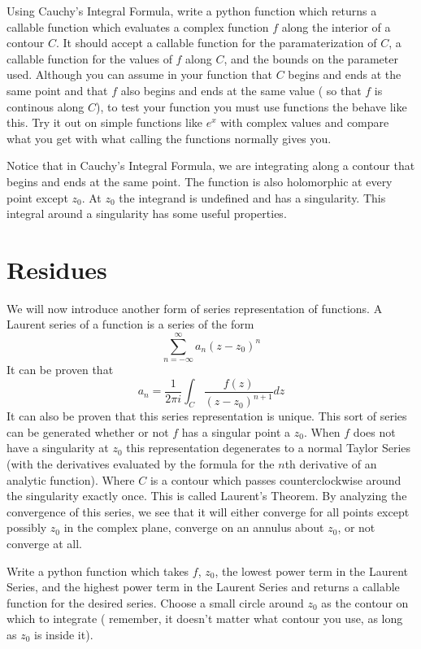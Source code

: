 \begin{problem}
Using Cauchy's Integral Formula, write a python function which returns a callable function which evaluates a complex function $f$ along the interior of a contour $C$. It should accept a callable function for the paramaterization of $C$, a callable function for the values of $f$ along $C$, and the bounds on the parameter used. Although you can assume in your function  that $C$ begins and ends at the same point and that $f$ also begins and ends at the same value ( so that $f$ is continous along $C$), to test your function you must use functions the behave like this. Try it out on simple functions like $e^x$ with complex values and compare what you get with what calling the functions normally gives you.
\end{problem}

Notice that in Cauchy's Integral Formula, we are integrating along a contour that begins and ends at the same point.
The function is also holomorphic at every point except $z_0$. At $z_0$ the integrand is undefined and has a singularity.
This integral around a singularity has some useful properties.

\section*{Residues}

We will now introduce another form of series representation of functions.
A Laurent series of a function is a series of the form $$\sum_{n= -\infty}^{\infty} a_n (z-z_0)^n$$
It can be proven that 
$$a_n = \frac{1}{2\pi i} \int_C \frac{f(z)}{(z-z_0)^{n+1}} dz$$ 
It can also be proven that this series representation is unique.
This sort of series can be generated whether or not $f$ has a singular point a $z_0$.
When $f$ does not have a singularity at $z_0$ this representation degenerates to a normal Taylor Series (with the derivatives evaluated by the formula for the $n$th derivative of an analytic function).
Where $C$ is a contour which passes counterclockwise around the singularity exactly once.
This is called Laurent's Theorem.
By analyzing the convergence of this series, we see that it will either converge for all points except possibly $z_0$ in the complex plane, converge on an annulus about $z_0$, or not converge at all.

\begin{problem}
Write a python function which takes $f$, $z_0$, the lowest power term in the Laurent Series, and the highest power term in the Laurent Series and returns a callable function for the desired series. Choose a small circle around $z_0$ as the contour on which to integrate ( remember, it doesn't matter what contour you use, as long as $z_0$ is inside it).
\end{problem}

